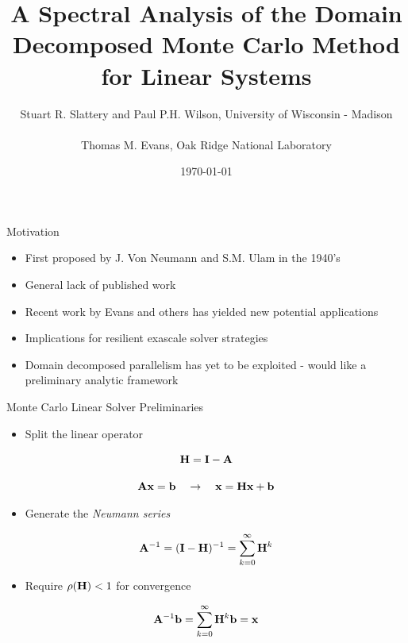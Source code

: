 \documentclass{beamer}
\author{\small Stuart R. Slattery and Paul P.H. Wilson, University of Wisconsin - Madison
  \\ \
  \\ Thomas M. Evans, Oak Ridge National Laboratory
}
\date{\today}
\title{A Spectral Analysis of the Domain Decomposed Monte Carlo Method
for Linear Systems}
\begin{document}
\maketitle

\begin{frame}{Motivation}

  \begin{itemize}
  \item First proposed by J. Von Neumann and S.M. Ulam in the 1940's
    \bigskip
  \item General lack of published work
    \bigskip
  \item Recent work by Evans and others has yielded new potential
    applications
    \bigskip
  \item Implications for resilient exascale solver strategies
    \bigskip
  \item Domain decomposed parallelism has yet to be exploited - would
    like a preliminary analytic framework
  \end{itemize}

\end{frame}

\begin{frame}{Monte Carlo Linear Solver Preliminaries}

  \begin{itemize}
  \item Split the linear operator
  \end{itemize}

  \[
  \mathbf{H} = \mathbf{I} - \mathbf{A}
  \]

  \[
  \mathbf{A}\mathbf{x} = \mathbf{b} \ \ \ \rightarrow \ \ \ \mathbf{x} = \mathbf{H} \mathbf{x}
  + \mathbf{b}
  \]

  \medskip
  \begin{itemize}
  \item Generate the \textit{Neumann series}
  \end{itemize}
  
  \[
  \mathbf{A}^{-1} = (\mathbf{I}-\mathbf{H})^{-1} = \sum_{k=0}^{\infty} \mathbf{H}^k
  \]

  \medskip
  \begin{itemize}
  \item Require $\rho(\mathbf{H}) < 1$ for convergence
  \end{itemize}

  \[
  \mathbf{A}^{-1}\mathbf{b} = \sum_{k=0}^{\infty} \mathbf{H}^k\mathbf{b} = \mathbf{x}
  \]

\end{frame}
\end{document}
